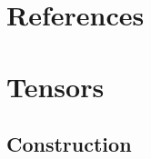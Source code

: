 \documentclass[
]{book}
\begin{document}
\hypertarget{references}{%
\chapter*{References}\label{references}}

\cleardoublepage

\hypertarget{appendix-appendix}{%
\appendix}


\hypertarget{tensors}{%
\chapter{Tensors}\label{tensors}}

\hypertarget{construction-3}{%
\section{Construction}\label{construction-3}}
\end{document}
